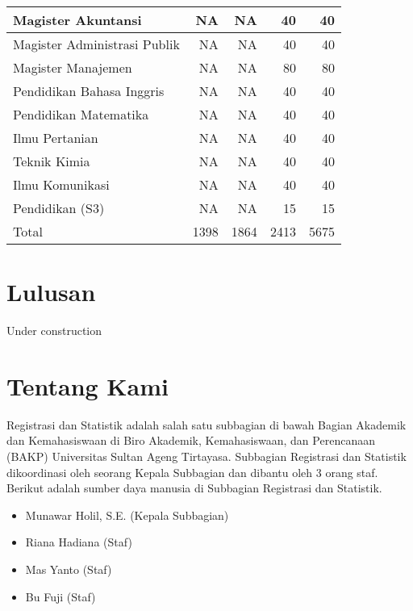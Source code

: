 \documentclass[
]{book}
\providecommand{\tightlist}{%
  \setlength{\itemsep}{0pt}\setlength{\parskip}{0pt}}
\begin{document}
\begin{table}[H]
{\begin{tabular}{l|r|r|r|r}
\hline
\hspace{1em}Magister Akuntansi & NA & NA & 40 & 40\\
\hline
\hspace{1em}Magister Administrasi Publik & NA & NA & 40 & 40\\
\hline
\hspace{1em}Magister Manajemen & NA & NA & 80 & 80\\
\hline
\hspace{1em}Pendidikan Bahasa Inggris & NA & NA & 40 & 40\\
\hline
\hspace{1em}Pendidikan Matematika & NA & NA & 40 & 40\\
\hline
\hspace{1em}Ilmu Pertanian & NA & NA & 40 & 40\\
\hline
\hspace{1em}Teknik Kimia & NA & NA & 40 & 40\\
\hline
\hspace{1em}Ilmu Komunikasi & NA & NA & 40 & 40\\
\hline
\hspace{1em}Pendidikan (S3) & NA & NA & 15 & 15\\
\hline
Total & 1398 & 1864 & 2413 & 5675\\
\hline
\end{tabular}}
\end{table}

\hypertarget{lulusan}{%
\chapter{Lulusan}\label{lulusan}}

Under construction

\hypertarget{tentang-kami}{%
\chapter*{Tentang Kami}\label{tentang-kami}}

Registrasi dan Statistik adalah salah satu subbagian di bawah Bagian Akademik dan Kemahasiswaan di Biro Akademik, Kemahasiswaan, dan Perencanaan (BAKP) Universitas Sultan Ageng Tirtayasa. Subbagian Registrasi dan Statistik dikoordinasi oleh seorang Kepala Subbagian dan dibantu oleh 3 orang staf. Berikut adalah sumber daya manusia di Subbagian Registrasi dan Statistik.

\begin{itemize}
\tightlist
\item
  Munawar Holil, S.E. (Kepala Subbagian)
\item
  Riana Hadiana (Staf)
\item
  Mas Yanto (Staf)
\item
  Bu Fuji (Staf)
\end{itemize}

  
\end{document}
